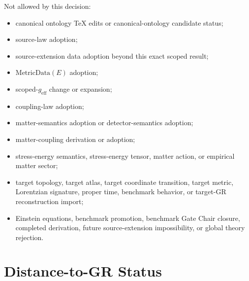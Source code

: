 \documentclass[11pt]{article}
\newcommand{\MetricData}{\mathrm{MetricData}}
\newcommand{\geff}{g_{\mathrm{eff}}}
\begin{document}
Not allowed by this decision:
\begin{itemize}[leftmargin=*]
  \item canonical ontology TeX edits or canonical-ontology candidate status;
  \item source-law adoption;
  \item source-extension data adoption beyond this exact scoped result;
  \item \(\MetricData(E)\) adoption;
  \item scoped-\(\geff\) change or expansion;
  \item coupling-law adoption;
  \item matter-semantics adoption or detector-semantics adoption;
  \item matter-coupling derivation or adoption;
  \item stress-energy semantics, stress-energy tensor, matter action, or
  empirical matter sector;
  \item target topology, target atlas, target coordinate transition, target
  metric, Lorentzian signature, proper time, benchmark behavior, or target-GR
  reconstruction import;
  \item Einstein equations, benchmark promotion, benchmark Gate Chair closure,
  completed derivation, future source-extension impossibility, or global
  theory rejection.
\end{itemize}

\section{Distance-to-GR Status}
\end{document}
